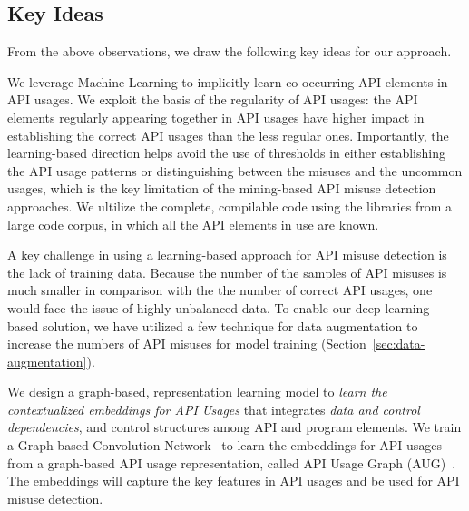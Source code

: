 \subsection{Key Ideas}
\label{sec:key-ideas}

From the above observations, we draw the following key ideas for our
approach.

\begin{key-idea}
We leverage Machine Learning to implicitly learn co-occurring API
elements in API usages. We exploit the basis of the regularity of API
usages: the API elements regularly appearing together in API usages
have higher impact in establishing the correct API usages than the
less regular ones. Importantly, the learning-based direction helps
avoid the use of thresholds in either establishing the API usage
patterns or distinguishing between the misuses and the uncommon
usages, which is the key limitation of the mining-based API misuse
detection approaches. We ultilize the complete, compilable code
using the libraries from a large code corpus, in which all the API
elements in use are known.
\end{key-idea}


\begin{key-idea}
A key challenge in using a learning-based approach for API misuse
detection is the lack of training data. Because the number of the
samples of API misuses is much smaller in comparison with the the
number of correct API usages, one would face the issue of highly
unbalanced data. To enable our deep-learning-based solution, we have
utilized a few technique for data augmentation to increase the numbers
of API misuses for model training
(Section~\ref{sec:data-augmentation}).
\end{key-idea}

\begin{key-idea}
We design a graph-based, representation learning model to {\em learn
  the contextualized embeddings for API Usages} that integrates {\em
  data and control dependencies}, and control structures among API and
program elements. We train a Graph-based Convolution
Network~\cite{gcn} to learn the embeddings for API usages from a
graph-based API usage representation, called API Usage Graph
(AUG)~\cite{tien}. The embeddings will capture the key features
in API usages and be used for API misuse detection.
\end{key-idea}
